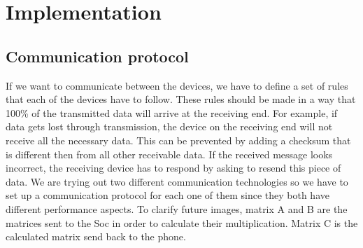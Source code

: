 \documentclass[a4paper, 11pt]{report}
\begin{document}
		

	
	
	\chapter{Implementation}
	
	
\section{Communication protocol}
If we want to communicate between the devices, we have to define a set of rules that each of the devices have to follow. These rules should be made in a way that 100\% of the transmitted data will arrive at the receiving end. For example, if data gets lost through transmission, the device on the receiving end will not receive all the necessary data. This can be prevented by adding a checksum that is different then from all other receivable data. If the received message looks incorrect, the receiving device has to respond by asking to resend this piece of data. We are trying out two different communication technologies so we have to set up a communication protocol for each one of them since they both have different performance aspects. To clarify future images, matrix A and B are the matrices sent to the Soc in order to calculate their multiplication. Matrix C is the calculated matrix send back to the phone.
\end{document}
